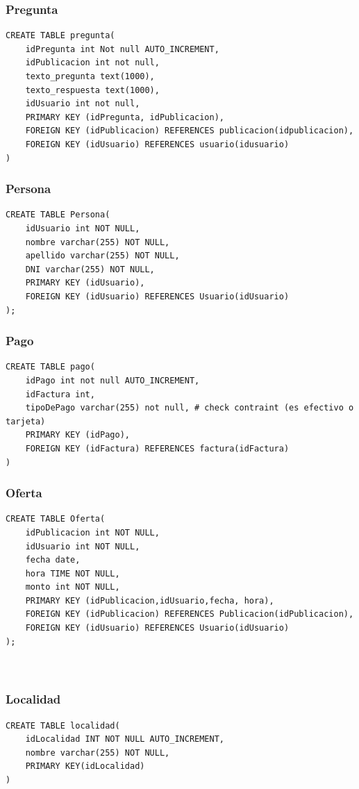 \documentclass[a4paper, 10pt, twoside]{article}
\begin{document}
\subsubsection{Pregunta}
\begin{verbatim}
CREATE TABLE pregunta(
	idPregunta int Not null AUTO_INCREMENT,
    idPublicacion int not null,
    texto_pregunta text(1000),
    texto_respuesta text(1000),
	idUsuario int not null,
    PRIMARY KEY (idPregunta, idPublicacion),
    FOREIGN KEY (idPublicacion) REFERENCES publicacion(idpublicacion),
    FOREIGN KEY (idUsuario) REFERENCES usuario(idusuario)
)
\end{verbatim}
\subsubsection{Persona}
\begin{verbatim}
CREATE TABLE Persona(
	idUsuario int NOT NULL,
	nombre varchar(255) NOT NULL,
	apellido varchar(255) NOT NULL,
	DNI varchar(255) NOT NULL,
    PRIMARY KEY (idUsuario),
    FOREIGN KEY (idUsuario) REFERENCES Usuario(idUsuario)
);
\end{verbatim}
\subsubsection{Pago}
\begin{verbatim}
CREATE TABLE pago(
	idPago int not null AUTO_INCREMENT,
	idFactura int,
    tipoDePago varchar(255) not null, # check contraint (es efectivo o tarjeta)
    PRIMARY KEY (idPago),
    FOREIGN KEY (idFactura) REFERENCES factura(idFactura)
)
\end{verbatim}
\subsubsection{Oferta}
\begin{verbatim}
CREATE TABLE Oferta(
	idPublicacion int NOT NULL,
	idUsuario int NOT NULL,
	fecha date, 
    hora TIME NOT NULL,
	monto int NOT NULL,
    PRIMARY KEY (idPublicacion,idUsuario,fecha, hora),
    FOREIGN KEY (idPublicacion) REFERENCES Publicacion(idPublicacion),
	FOREIGN KEY (idUsuario) REFERENCES Usuario(idUsuario)
);



\end{verbatim}
\subsubsection{Localidad}
\begin{verbatim}
CREATE TABLE localidad(
	idLocalidad INT NOT NULL AUTO_INCREMENT,
    nombre varchar(255) NOT NULL,
    PRIMARY KEY(idLocalidad)
)
\end{verbatim}
\end{document}
